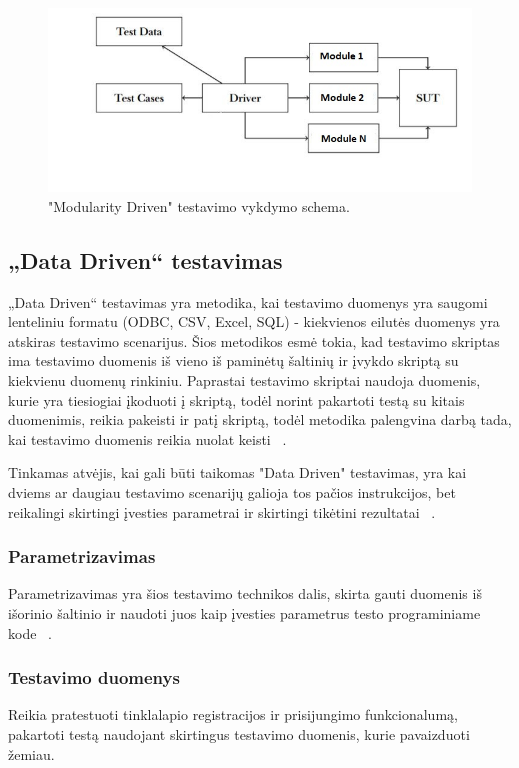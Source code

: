 \documentclass[a4paper,12pt,fleqn]{article}
\begin{document}
\begin{figure}[h]
    \centering
    \includegraphics[width=1\textwidth]{Module.JPG}
    \caption{"Modularity Driven" testavimo vykdymo schema.}
    \label{fig:data}
\end{figure}

\newpage
\subsection{„Data Driven“ testavimas}
„Data Driven“ testavimas yra metodika, kai testavimo duomenys yra saugomi lenteliniu formatu (ODBC, CSV, Excel, SQL) - kiekvienos eilutės duomenys yra atskiras testavimo scenarijus. Šios metodikos esmė tokia, kad testavimo skriptas ima testavimo duomenis iš vieno iš paminėtų šaltinių ir įvykdo skriptą su kiekvienu duomenų rinkiniu. Paprastai testavimo skriptai naudoja duomenis, kurie yra tiesiogiai įkoduoti į skriptą, todėl norint pakartoti testą su kitais duomenimis, reikia pakeisti ir patį skriptą, todėl metodika palengvina darbą tada, kai testavimo duomenis reikia nuolat keisti  ~\cite{ORACLEHelpCenter}.

Tinkamas atvėjis, kai gali būti taikomas "Data Driven" testavimas, yra kai dviems ar daugiau testavimo scenarijų galioja tos pačios instrukcijos, bet reikalingi skirtingi įvesties parametrai ir skirtingi tikėtini rezultatai  ~\cite{ORACLEHelpCenter}.

\subsubsection{Parametrizavimas}
Parametrizavimas yra šios testavimo technikos dalis, skirta gauti duomenis iš išorinio šaltinio ir naudoti juos kaip įvesties parametrus testo programiniame kode  ~\cite{ORACLEHelpCenter}.

\subsubsection{Testavimo duomenys}
Reikia pratestuoti tinklalapio registracijos ir prisijungimo funkcionalumą, pakartoti testą naudojant skirtingus testavimo duomenis, kurie pavaizduoti žemiau.
\newline
\end{document}
